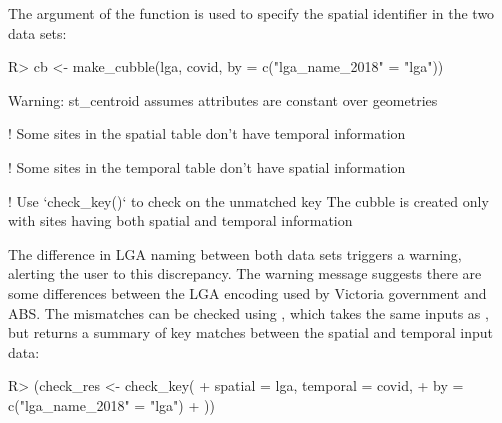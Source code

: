 \documentclass[
  shortnames]{jss}
\begin{document}
The  argument of the function  is used to specify the spatial identifier in the two data sets:

\begin{CodeChunk}
\begin{CodeInput}
R> cb <- make_cubble(lga, covid, by = c("lga_name_2018" = "lga"))
\end{CodeInput}
\begin{CodeOutput}
Warning: st_centroid assumes attributes are constant over geometries
\end{CodeOutput}
\begin{CodeOutput}
! Some sites in the spatial table don't have temporal information
\end{CodeOutput}
\begin{CodeOutput}
! Some sites in the temporal table don't have spatial information
\end{CodeOutput}
\begin{CodeOutput}
! Use `check_key()` to check on the unmatched key
The cubble is created only with sites having both spatial and
temporal information
\end{CodeOutput}
\end{CodeChunk}

The difference in LGA naming between both data sets triggers a warning, alerting the user to this discrepancy. The warning message suggests there are some differences between the LGA encoding used by Victoria government and ABS. The mismatches can be checked using , which takes the same inputs as , but returns a summary of key matches between the spatial and temporal input data:

\begin{CodeChunk}
\begin{CodeInput}
R> (check_res <- check_key(
+   spatial = lga, temporal = covid, 
+   by = c("lga_name_2018" = "lga")
+ ))
\end{CodeInput}
\end{CodeChunk}
\end{document}

